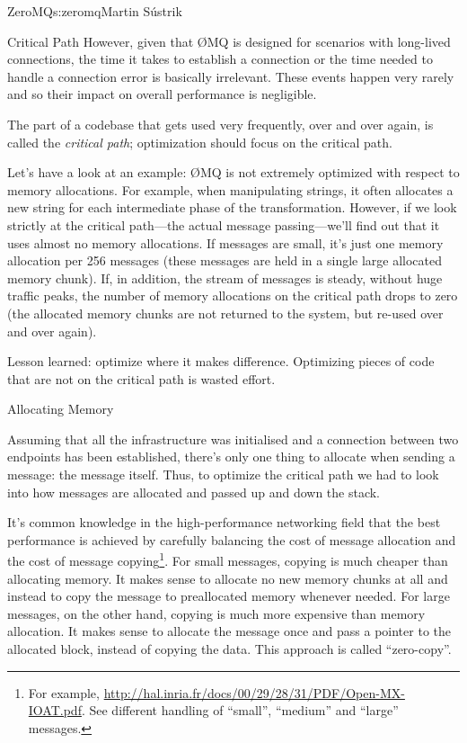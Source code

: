 \begin{aosachapter}{ZeroMQ}{s:zeromq}{Martin S\'{u}strik}
\begin{aosasect1}{Critical Path}
However, given that {\O}MQ is designed for scenarios with long-lived
connections, the time it takes to establish a connection or the time
needed to handle a connection error is basically irrelevant. These
events happen very rarely and so their impact on overall performance
is negligible.

The part of a codebase that gets used very frequently, over and over
again, is called the \emph{critical path}; optimization should focus on
the critical path.

Let's have a look at an example: {\O}MQ is not extremely optimized with
respect to memory allocations. For example, when manipulating strings,
it often allocates a new string for each intermediate phase of the
transformation. However, if we look strictly at the critical path---the
actual message passing---we'll find out that it uses almost no memory
allocations. If messages are small, it's just one memory allocation
per 256 messages (these messages are held in a single large allocated
memory chunk). If, in addition, the stream of messages is steady,
without huge traffic peaks, the number of memory allocations on the
critical path drops to zero (the allocated memory chunks are not
returned to the system, but re-used over and over again).

Lesson learned: optimize where it makes difference. Optimizing pieces
of code that are not on the critical path is wasted effort.

\end{aosasect1}

\begin{aosasect1}{Allocating Memory}

Assuming that all the infrastructure was initialised and a connection
between two endpoints has been established, there's only one thing
to allocate when sending a message: the message itself. Thus, to
optimize the critical path we had to look into how messages are
allocated and passed up and down the stack.

It's common knowledge in the high-performance networking field that the best
performance is achieved by carefully balancing the cost of message
allocation and the cost of message copying\footnote{For example,
  \url{http://hal.inria.fr/docs/00/29/28/31/PDF/Open-MX-IOAT.pdf}.
  See different handling of ``small'', ``medium'' and ``large''
  messages.}. For small messages, copying is much cheaper than
allocating memory. It makes sense to allocate no new memory chunks at
all and instead to copy the message to preallocated memory whenever
needed. For large messages, on the other hand, copying is much more
expensive than memory allocation. It makes sense to allocate the
message once and pass a pointer to the allocated block, instead of
copying the data. This approach is called ``zero-copy''.


\end{aosasect1}
\end{aosachapter}
